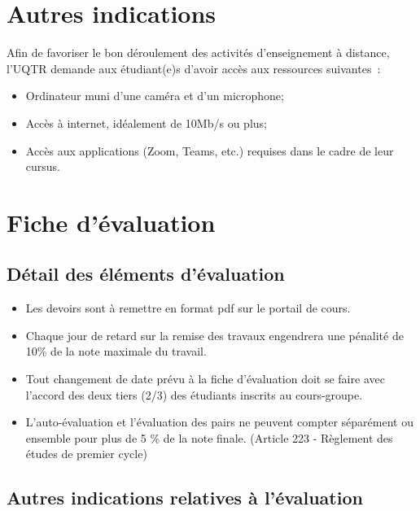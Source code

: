 \documentclass[12pt,undergraduate]{uqtrplandecours}
\begin{document}
\section{Autres indications}

Afin de favoriser le bon déroulement des activités d'enseignement à distance,
  l'UQTR demande aux étudiant(e)s d'avoir accès aux ressources suivantes :
\begin{itemize}
  \item Ordinateur muni d'une caméra et d'un microphone;
  \item Accès à internet, idéalement de 10Mb/s ou plus;
  \item Accès aux applications (Zoom, Teams, etc.) requises dans le cadre de leur cursus.
\end{itemize}


\section{Fiche d'évaluation}

\subsection*{Détail des éléments d'évaluation}

\printevaltable 

\begin{itemize}
  \item Les devoirs sont à remettre en format pdf sur le portail de cours.
  \item Chaque jour de retard sur la remise des travaux
        engendrera une pénalité de 10\% de la note maximale du travail.
  \item Tout changement de date prévu à la fiche d’évaluation doit se faire
        avec l’accord des deux tiers (2/3) des étudiants inscrits au cours-groupe.
  \item L’auto-évaluation et l’évaluation des pairs ne peuvent compter
        séparément ou ensemble pour plus de 5 \% de la note finale.
        (Article 223 - Règlement des études de premier cycle)
\end{itemize}


\subsection*{Autres indications relatives à l'évaluation}
\end{document}
